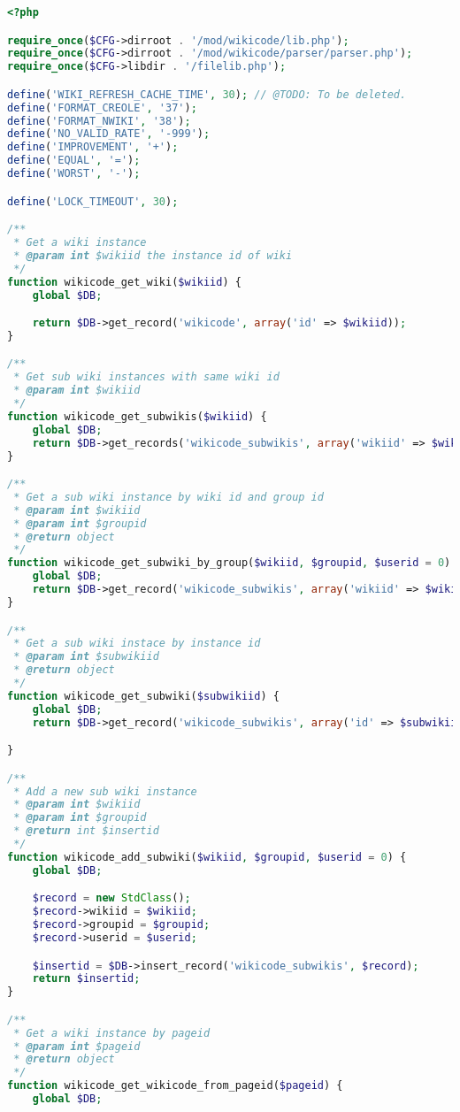 \begin{lstlisting}[language=PHP]
<?php

require_once($CFG->dirroot . '/mod/wikicode/lib.php');
require_once($CFG->dirroot . '/mod/wikicode/parser/parser.php');
require_once($CFG->libdir . '/filelib.php');

define('WIKI_REFRESH_CACHE_TIME', 30); // @TODO: To be deleted.
define('FORMAT_CREOLE', '37');
define('FORMAT_NWIKI', '38');
define('NO_VALID_RATE', '-999');
define('IMPROVEMENT', '+');
define('EQUAL', '=');
define('WORST', '-');

define('LOCK_TIMEOUT', 30);

/**
 * Get a wiki instance
 * @param int $wikiid the instance id of wiki
 */
function wikicode_get_wiki($wikiid) {
    global $DB;

    return $DB->get_record('wikicode', array('id' => $wikiid));
}

/**
 * Get sub wiki instances with same wiki id
 * @param int $wikiid
 */
function wikicode_get_subwikis($wikiid) {
    global $DB;
    return $DB->get_records('wikicode_subwikis', array('wikiid' => $wikiid));
}

/**
 * Get a sub wiki instance by wiki id and group id
 * @param int $wikiid
 * @param int $groupid
 * @return object
 */
function wikicode_get_subwiki_by_group($wikiid, $groupid, $userid = 0) {
    global $DB;
    return $DB->get_record('wikicode_subwikis', array('wikiid' => $wikiid, 'groupid' => $groupid, 'userid' => $userid));
}

/**
 * Get a sub wiki instace by instance id
 * @param int $subwikiid
 * @return object
 */
function wikicode_get_subwiki($subwikiid) {
    global $DB;
    return $DB->get_record('wikicode_subwikis', array('id' => $subwikiid));

}

/**
 * Add a new sub wiki instance
 * @param int $wikiid
 * @param int $groupid
 * @return int $insertid
 */
function wikicode_add_subwiki($wikiid, $groupid, $userid = 0) {
    global $DB;

    $record = new StdClass();
    $record->wikiid = $wikiid;
    $record->groupid = $groupid;
    $record->userid = $userid;

    $insertid = $DB->insert_record('wikicode_subwikis', $record);
    return $insertid;
}

/**
 * Get a wiki instance by pageid
 * @param int $pageid
 * @return object
 */
function wikicode_get_wikicode_from_pageid($pageid) {
    global $DB;


\end{lstlisting}
